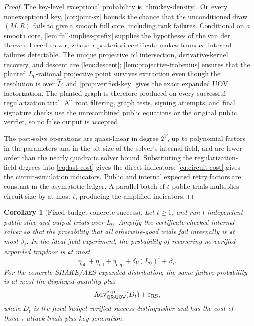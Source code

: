\documentclass[10pt,a4paper]{article}
\newtheorem{corollary}[theorem]{Corollary}
\newcommand{\oil}{\mathrm{oil}}
\newcommand{\off}{\mathrm{off}}
\newcommand{\dep}{\mathrm{dep}}
\newcommand{\QRUOV}{\textsf{QR-UOV}}
\newcommand{\Adv}{\operatorname{Adv}}
\begin{document}
\begin{proof}
The key-level exceptional probability is \cref{thm:key-density}.  On every nonexceptional key, \cref{cor:joint-sz} bounds the chance that the unconditioned draw $(M,R)$ fails to give a smooth full core, including rank failures.  Conditional on a smooth core, \cref{lem:full-implies-prefix} supplies the hypotheses of the van der Hoeven--Lecerf solver, whose a posteriori certificate makes bounded internal failures detectable.  The unique projective oil intersection, derivative-kernel recovery, and descent are \cref{lem:descent}; \cref{lem:projective-frobenius} ensures that the planted $L_0$-rational projective point survives extraction even though the resolution is over $\widehat L$; and \cref{prop:verified-key} gives the exact expanded UOV factorization.  The planted graph is therefore produced on every successful regularization trial.  All root filtering, graph tests, signing attempts, and final signature checks use the unrecombined public equations or the original public verifier, so no false output is accepted.

The post-solve operations are quasi-linear in degree $2^V$, up to polynomial factors in the parameters and in the bit size of the solver's internal field, and are lower order than the nearly quadratic solver bound.  Substituting the regularization-field degrees into \eqref{eq:fast-cost} gives the direct indicators; \eqref{eq:circuit-cost} gives the circuit-simulation indicators.  Public and internal expected retry factors are constant in the asymptotic ledger.  A parallel batch of $t$ public trials multiplies circuit size by at most $t$, producing the amplified indicators.
\end{proof}

\begin{corollary}[Fixed-budget concrete success]\label{cor:concrete-budget}
Let $t\ge1$, and run $t$ independent public slice-and-output trials over $L_0$.  Amplify the certificate-checked internal solver so that the probability that all otherwise-good trials fail internally is at most $\beta_t$.  In the ideal-field experiment, the probability of recovering no verified expanded trapdoor is at most
\[
\eta_{\off}+\eta_{\oil}+\eta_{\dep}+\delta_V(L_0)^t+\beta_t.
\]
For the concrete SHAKE/AES-expanded distribution, the same failure probability is at most the displayed quantity plus
\[
\Adv^{\rm exp}_{\QRUOV}(D_t)+\varepsilon_{\rm RS},
\]
where $D_t$ is the fixed-budget verified-success distinguisher and has the cost of those $t$ attack trials plus key generation.
\end{corollary}
\end{document}
